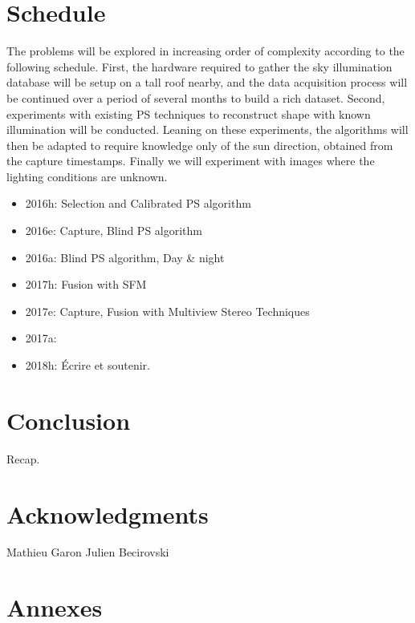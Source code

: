\documentclass{report}
\begin{document}


\chapter{Schedule}

The problems will be explored in increasing order of complexity according to the following schedule. First, the hardware required to gather the sky illumination database will be setup on a tall roof nearby, and the data acquisition process will be continued over a period of several months to build a rich dataset. Second, experiments with existing PS techniques to reconstruct shape with known illumination will be conducted. Leaning on these experiments, the algorithms will then be adapted to require knowledge only of the sun direction, obtained from the capture timestamps. Finally we will experiment with images where the lighting conditions are unknown.

\begin{itemize}
	\item 2016h: Selection and Calibrated PS algorithm
	\item 2016e: Capture, Blind PS algorithm
	\item 2016a: Blind PS algorithm, Day \& night
	\item 2017h: Fusion with SFM
	\item 2017e: Capture, Fusion with Multiview Stereo Techniques
	\item 2017a:
	\item 2018h: Écrire et soutenir.
\end{itemize}


\chapter{Conclusion}\label{conclusion}

Recap.

\chapter*{Acknowledgments}

Mathieu Garon
Julien Becirovski

\chapter*{Annexes}
\end{document}
